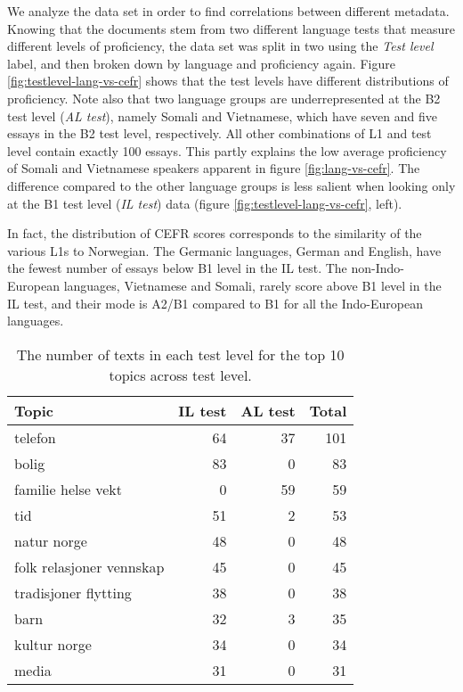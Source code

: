 We analyze the data set in order to find correlations between different
metadata. Knowing that the documents stem from two different language tests
that measure different levels of proficiency, the data set was split in two
using the \emph{Test level} label, and then broken down by language and
proficiency again. Figure \ref{fig:testlevel-lang-vs-cefr} shows that the
test levels have different distributions of proficiency. Note also that two
language groups are underrepresented at the B2 test level (\emph{AL test}),
namely Somali and Vietnamese, which have seven and five essays in the B2 test
level, respectively. All other combinations of L1 and test level contain
exactly 100 essays. This partly explains the low average proficiency of
Somali and Vietnamese speakers apparent in figure \ref{fig:lang-vs-cefr}. The
difference compared to the other language groups is less salient when looking
only at the B1 test level (\emph{IL test}) data (figure
\ref{fig:testlevel-lang-vs-cefr}, left).

In fact, the distribution of CEFR scores corresponds to the similarity of the
various \acp{L1} to Norwegian. The Germanic languages, German and English,
have the fewest number of essays below B1 level in the IL test. The
non-Indo-European languages, Vietnamese and Somali, rarely score above B1
level in the IL test, and their mode is A2/B1 compared to B1 for all the
Indo-European languages.

\begin{table}
  \centering
  \begin{tabular}{lrrr}
    \toprule
    Topic                    & IL test & AL test & Total \\
    \midrule
    telefon                  &      64 &      37 &   101 \\
    bolig                    &      83 &       0 &    83 \\
    familie helse vekt       &       0 &      59 &    59 \\
    tid                      &      51 &       2 &    53 \\
    natur norge              &      48 &       0 &    48 \\
    folk relasjoner vennskap &      45 &       0 &    45 \\
    tradisjoner flytting     &      38 &       0 &    38 \\
    barn                     &      32 &       3 &    35 \\
    kultur norge             &      34 &       0 &    34 \\
    media                    &      31 &       0 &    31 \\
    \bottomrule
  \end{tabular}
  \caption[Most common topics in ASK texts]{
    The number of texts in each test level for the top 10 topics
    across test level.
  }
  \label{tab:texts-per-topic}
\end{table}

